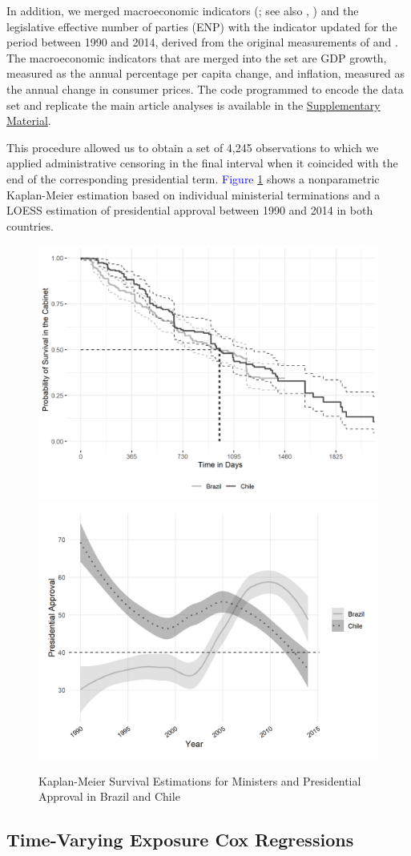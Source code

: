 \documentclass[12pt,halfline,a4paper]{ouparticle}
\begin{document}
In addition, we merged \citeauthor{WorldBank2020} macroeconomic indicators (\citeyear{WorldBank2020}; see also \citeauthor{Piburn2020}, \citeyear{Piburn2020}) and the legislative effective number of parties (ENP) with the \cite{Gallagher2005} indicator updated for the period between 1990 and 2014, derived from the original measurements of \cite{Laakso1979} and \cite{Gallagher1991}. The macroeconomic indicators that are merged into the set are GDP growth, measured as the annual percentage per capita change, and inflation, measured as the annual change in consumer prices. The code programmed to encode the data set and replicate the main article analyses is available in the \href{https://osf.io/asgbj/?view_only=144acd6c8eca4836880b57dee85ea4ff}{Supplementary Material}.

This procedure allowed us to obtain a set of 4,245 observations to which we applied administrative censoring in the final interval when it coincided with the end of the corresponding presidential term. \textcolor{blue}{Figure} \ref{FIG1} shows a nonparametric Kaplan-Meier estimation based on individual ministerial terminations and a LOESS estimation of presidential approval between 1990 and 2014 in both countries.

\begin{figure}[h]
\caption{Kaplan-Meier Survival Estimations for Ministers and Presidential Approval in Brazil and Chile}
\label{FIG1}
\centering \vspace{2mm}
\includegraphics[width=0.49\linewidth]{figures/kaplan_meier} \includegraphics[width=0.49\linewidth]{figures/approval} \\ \vspace{2mm}
\end{figure}

\subsection{Time-Varying Exposure Cox Regressions}
\label{sec3.2}



\end{document}
